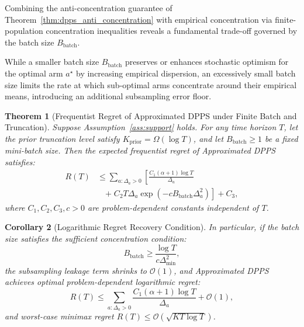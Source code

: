\documentclass[twoside]{article}
\newtheorem{theorem}{Theorem}
\newtheorem{corollary}[theorem]{Corollary}
\begin{document}
Combining the anti-concentration guarantee of Theorem~\ref{thm:dpps_anti_concentration} with empirical concentration via finite-population concentration inequalities \citep{serfling1974probability} reveals a fundamental trade-off governed by the batch size $B_{\text{batch}}$. 

While a smaller batch size $B_{\text{batch}}$ preserves or enhances stochastic optimism for the optimal arm $a^\star$ by increasing empirical dispersion, an excessively small batch size limits the rate at which sub-optimal arms concentrate around their empirical means, introducing an additional subsampling error floor.

\begin{theorem}[Frequentist Regret of Approximated DPPS under Finite Batch and Truncation]
\label{thm:approximated_dpps_regret}
\label{thm:dpps_regret}
Suppose Assumption~\ref{ass:support} holds. For any time horizon $T$, let the prior truncation level satisfy $K_{\text{prior}} = \Omega(\log T)$, and let $B_{\text{batch}} \ge 1$ be a fixed mini-batch size. Then the expected frequentist regret of Approximated DPPS satisfies:
\begin{equation}
\label{eq:finite_batch_regret_bound}
\label{eq:regret_batch_dep}
\begin{aligned}
R(T) &\le \sum_{a: \Delta_a > 0} \left[ \frac{C_1 (\alpha + 1) \log T}{\Delta_a} \right. \\
&\quad \left. + \; C_2 T \Delta_a \exp\left( - c B_{\text{batch}} \Delta_a^2 \right) \right] + C_3,
\end{aligned}
\end{equation}
where $C_1, C_2, C_3, c > 0$ are problem-dependent constants independent of $T$.
\end{theorem}

\begin{corollary}[Logarithmic Regret Recovery Condition]
\label{cor:batch_logarithmic}
In particular, if the batch size satisfies the sufficient concentration condition:
\begin{equation}
B_{\text{batch}} \ge \frac{\log T}{c \Delta_{\min}^2},
\end{equation}
the subsampling leakage term shrinks to $\mathcal{O}(1)$, and Approximated DPPS achieves optimal problem-dependent logarithmic regret:
\begin{equation}
R(T) \le \sum_{a: \Delta_a > 0} \frac{C_1 (\alpha + 1) \log T}{\Delta_a} + \mathcal{O}(1),
\end{equation}
and worst-case minimax regret $R(T) \le \mathcal{O}\left( \sqrt{K T \log T} \right)$.
\end{corollary}
\end{document}
